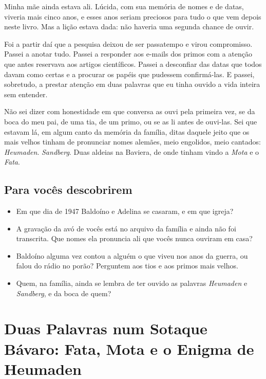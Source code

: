 \documentclass[
  brazilian,
  11pt,
  openany]{book}
\providecommand{\tightlist}{%
  \setlength{\itemsep}{0pt}\setlength{\parskip}{0pt}}
\begin{document}
Minha mãe ainda estava ali. Lúcida, com sua memória de nomes e de datas,
viveria mais cinco anos, e esses anos seriam preciosos para tudo o que
vem depois neste livro. Mas a lição estava dada: não haveria uma segunda
chance de ouvir.

Foi a partir daí que a pesquisa deixou de ser passatempo e virou
compromisso. Passei a anotar tudo. Passei a responder aos e-mails dos
primos com a atenção que antes reservava aos artigos científicos. Passei
a desconfiar das datas que todos davam como certas e a procurar os
papéis que pudessem confirmá-las. E passei, sobretudo, a prestar atenção
em duas palavras que eu tinha ouvido a vida inteira sem entender.

Não sei dizer com honestidade em que conversa as ouvi pela primeira vez,
se da boca do meu pai, de uma tia, de um primo, ou se as li antes de
ouvi-las. Sei que estavam lá, em algum canto da memória da família,
ditas daquele jeito que os mais velhos tinham de pronunciar nomes
alemães, meio engolidos, meio cantados: \emph{Heumaden}.
\emph{Sandberg}. Duas aldeias na Baviera, de onde tinham vindo a
\emph{Mota} e o \emph{Fata}.

\section{Para vocês descobrirem}\label{para-vocuxeas-descobrirem}

\begin{itemize}
\tightlist
\item
  Em que dia de 1947 Baldoíno e Adelina se casaram, e em que igreja?
\item
  A gravação da avó de vocês está no arquivo da família e ainda não foi
  transcrita. Que nomes ela pronuncia ali que vocês nunca ouviram em
  casa?
\item
  Baldoíno alguma vez contou a alguém o que viveu nos anos da guerra, ou
  falou do rádio no porão? Perguntem aos tios e aos primos mais velhos.
\item
  Quem, na família, ainda se lembra de ter ouvido as palavras
  \emph{Heumaden} e \emph{Sandberg}, e da boca de quem?
\end{itemize}

\chapter{Duas Palavras num Sotaque Bávaro: Fata, Mota e o Enigma de
Heumaden}\label{cap-2}
\end{document}
